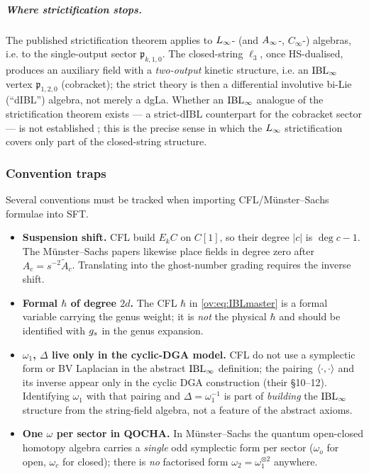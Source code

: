 \subparagraph{Where strictification stops.} The published strictification theorem
\cite{Borsten:2021:DoubleCopyHomotopy} applies to $L_\infty$- (and $A_\infty$-, $C_\infty$-) algebras, i.e. to the
single-output sector $\mathfrak{p}_{k,1,0}$. The closed-string $\ell_3$, once HS-dualised,
produces an auxiliary field with a \emph{two-output} kinetic structure, i.e. an $\mathrm{IBL}_\infty$ vertex
$\mathfrak{p}_{1,2,0}$ (cobracket); the strict theory is then a differential involutive bi-Lie
(``dIBL'') algebra, not merely a dgLa. Whether an $\mathrm{IBL}_\infty$ analogue of the strictification theorem
exists --- a strict-dIBL counterpart for the cobracket sector --- is not established
\cite{Borsten:2021:DoubleCopyHomotopy}; this is the precise sense in which the $L_\infty$ strictification covers only
part of the closed-string structure.

\subsubsection{Convention traps}

Several conventions must be tracked when importing CFL/Münster--Sachs formulae into SFT.
\begin{itemize}[leftmargin=*]
	\item \textbf{Suspension shift.} CFL build $E_kC$ on $C[1]$, so their degree $|c|$ is
	$\deg c-1$. The Münster--Sachs papers \cite{MunsterSachs2013,Muenster:2014:HomotopyClassificationBosonic} likewise
	place fields in degree zero after $A_c=s^{-2}\tilde A_c$. Translating into the ghost-number
	grading requires the inverse shift.
	\item \textbf{Formal $\hbar$ of degree $2d$.} The CFL $\hbar$ in \eqref{ov:eq:IBLmaster} is a
	formal variable carrying the genus weight; it is \emph{not} the physical $\hbar$ and should
	be identified with $g_s$ in the genus expansion.
	\item \textbf{$\omega_1$, $\Delta$ live only in the cyclic-DGA model.} CFL do not use a
	symplectic form or BV Laplacian in the abstract $\mathrm{IBL}_\infty$ definition; the pairing
	$\left \langle \cdot,\cdot \right \rangle$ and its inverse appear only in the cyclic DGA construction (their
	§10--12). Identifying $\omega_1$ with that pairing and $\Delta=\omega_1^{-1}$ is part of
	\emph{building} the $\mathrm{IBL}_\infty$ structure from the string-field algebra, not a feature of the
	abstract axioms.
	\item \textbf{One $\omega$ per sector in QOCHA.} In Münster--Sachs \cite{MunsterSachs2013}
	the quantum open-closed homotopy algebra carries a \emph{single} odd symplectic form per
	sector ($\omega_o$ for open, $\omega_c$ for closed); there is \emph{no} factorised form
	$\omega_2=\omega_1^{\otimes2}$ anywhere. 
\end{itemize}


